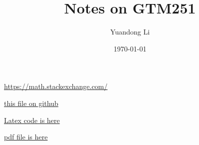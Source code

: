 \def\allfiles{} %



\title{Notes on GTM251}
\author{Yuandong Li}
\date{\today}




\maketitle

\tableofcontents
\newpage

\url{https://math.stackexchange.com/}

\href{https://raw.githubusercontent.com/ocbaby/research_notes/fbfbf39a26362487ce0c1859e49a89646d013da1/Reading\%20Notes/Finite\%20Simple\%20Groups/wilson.pdf}{this file on github}

\href{./wilson.tex}{Latex code is here}

\href{./wilson.pdf}{pdf file is here}

\clearpage
% 

\clearpage
% 








